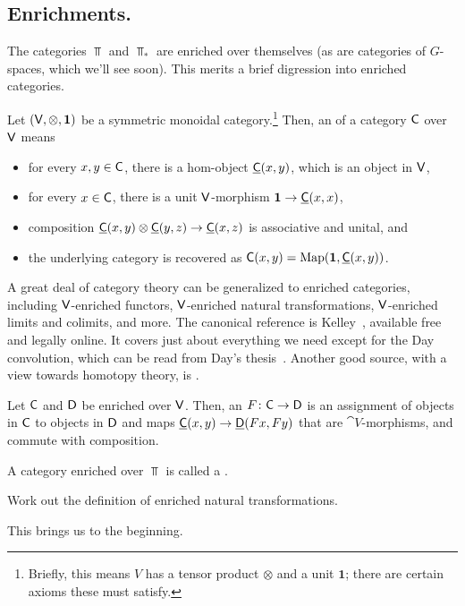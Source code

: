 \subsection*{Enrichments.}
The categories $\Top$ and $\Top_*$ are enriched over themselves (as are categories of $G$-spaces, which we'll see
soon). This merits a brief digression into enriched categories.
\begin{defn}
Let $(\mathsf V,\otimes, \boldsymbol 1)$ be a symmetric monoidal category.\footnote{Briefly, this means $V$ has a tensor
product $\otimes$ and a unit $\boldsymbol 1$; there are certain axioms these must satisfy.} Then, an
 of a category $\mathsf C$ over $\mathsf V$ means
\begin{itemize}
	\item for every $x,y\in\mathsf C$, there is a hom-object $\underline{\mathsf C}(x,y)$, which is an object in $\mathsf V$,
	\item for every $x\in\mathsf C$, there is a unit $\mathsf V$-morphism $\boldsymbol 1\to\underline{\mathsf C}(x,x)$,
	\item composition $\underline{\mathsf C}(x,y)\otimes\underline{\mathsf C}(y,z)\to\underline{\mathsf C}(x,z)$ is associative and unital,
	and
	\item the underlying category is recovered as $\mathsf C(x,y) = \operatorname{Map}(\boldsymbol 1, \underline{\mathsf C}(x,y))$.
\end{itemize}
\end{defn}
A great deal of category theory can be generalized to enriched categories, including $\mathsf V$-enriched functors,
$\mathsf V$-enriched natural transformations, $\mathsf V$-enriched limits and colimits, and more. The canonical reference is
Kelley~\cite{Kelley}, available free and legally online. It covers just about everything we need except for the Day
convolution, which can be read from Day's thesis~\cite{DayThesis}. Another good source, with a view towards
homotopy theory, is \cite[Chapter 3]{RiehlCHT}.
\begin{defn}
Let $\mathsf C$ and $\mathsf D$ be enriched over $\mathsf V$. Then, an  $F\colon\mathsf C\to\mathsf D$ is an assignment
of objects in $\mathsf C$ to objects in $\mathsf D$ and maps $\underline{\mathsf C}(x,y)\to\underline{\mathsf D}(Fx, Fy)$ that are $\cat
V$-morphisms, and commute with composition.
\end{defn}
A category enriched over $\Top$ is called a .
\begin{ex}
Work out the definition of enriched natural transformations.
\end{ex}
This brings us to the beginning.

